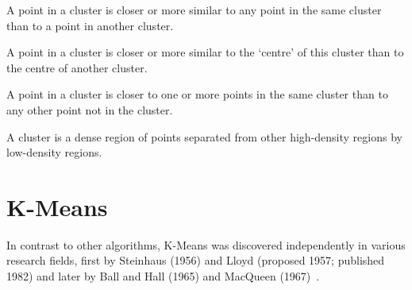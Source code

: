\documentclass[10pt,twocolumn,letterpaper]{article}
\begin{document}
\begin{definition}
    \label{def:well-separated}
    A point in a cluster is closer or more similar to any point in the same cluster
    than to a point in another cluster.
\end{definition}

\begin{definition}
    \label{def:centre-based}
    A point in a cluster is closer or more similar to the ‘centre’ of this cluster
    than to the centre of another cluster.
\end{definition}

\begin{definition}
    \label{def:contiguous}
    A point in a cluster is closer to one or more points in the same cluster than to
    any other point not in the cluster.
\end{definition}

\begin{definition}
    \label{def:density-based}
    A cluster is a dense region of points separated from other high-density
    regions by low-density regions.
\end{definition}


\section{K-Means}\label{sec:k-means}

In contrast to other algorithms, K-Means was discovered independently in
various research fields, first by Steinhaus (1956) and Lloyd (proposed 1957;
published 1982) and later by Ball and Hall (1965) and MacQueen
(1967)~\cite{Jain2010651}.
\end{document}
